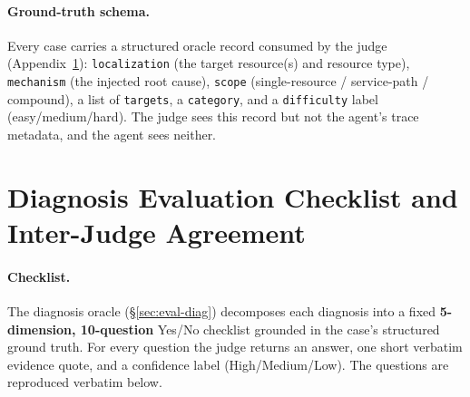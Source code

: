 \documentclass[letterpaper]{article}
\begin{document}
\paragraph{Ground-truth schema.}
Every case carries a structured oracle record consumed by the judge (Appendix~\ref{app:rubric}): \texttt{localization} (the target resource(s) and resource type), \texttt{mechanism} (the injected root cause), \texttt{scope} (single-resource / service-path / compound), a list of \texttt{targets}, a \texttt{category}, and a \texttt{difficulty} label (easy/medium/hard).
The judge sees this record but not the agent's trace metadata, and the agent sees neither.

\section{Diagnosis Evaluation Checklist and Inter-Judge Agreement}
\label{app:rubric}

\paragraph{Checklist.}
The diagnosis oracle (\S\ref{sec:eval-diag}) decomposes each diagnosis into a fixed \textbf{5-dimension, 10-question} Yes/No checklist grounded in the case's structured ground truth.
For every question the judge returns an answer, one short verbatim evidence quote, and a confidence label (High/Medium/Low).
The questions are reproduced verbatim below.
\end{document}
